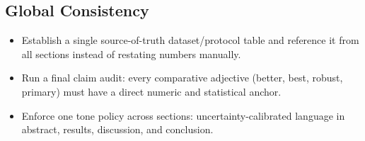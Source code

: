 \documentclass[11pt]{article}
\begin{document}
\subsection*{Global Consistency}
\begin{itemize}
  \item Establish a single source-of-truth dataset/protocol table and reference it from all sections instead of restating numbers manually.
  \item Run a final claim audit: every comparative adjective (better, best, robust, primary) must have a direct numeric and statistical anchor.
  \item Enforce one tone policy across sections: uncertainty-calibrated language in abstract, results, discussion, and conclusion.
\end{itemize}
\end{document}
